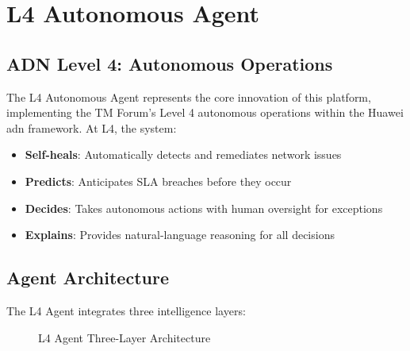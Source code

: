 \chapter{L4 Autonomous Agent}
\label{ch:l4-agent}

\section{ADN Level 4: Autonomous Operations}

The L4 Autonomous Agent represents the core innovation of this platform, implementing the TM Forum's Level 4 autonomous operations within the Huawei \gls{adn} framework. At L4, the system:

\begin{itemize}
    \item \textbf{Self-heals}: Automatically detects and remediates network issues
    \item \textbf{Predicts}: Anticipates SLA breaches before they occur
    \item \textbf{Decides}: Takes autonomous actions with human oversight for exceptions
    \item \textbf{Explains}: Provides natural-language reasoning for all decisions
\end{itemize}

\section{Agent Architecture}

The L4 Agent integrates three intelligence layers:

\begin{figure}[H]
\centering
{}
\caption{L4 Agent Three-Layer Architecture}
\label{fig:l4-architecture}
\end{figure}

